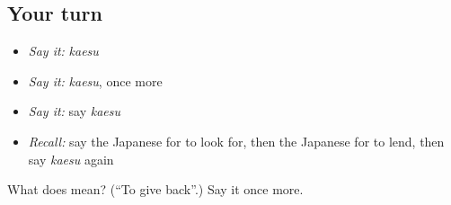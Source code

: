 \subsection*{Your turn}
\begin{itemize}
\raggedright
  \item \emph{Say it:} \emph{kaesu}
  \item \emph{Say it:} \emph{kaesu}, once more
  \item \emph{Say it:} say \emph{kaesu}
  \item \emph{Recall:} say the Japanese for to look for, then the Japanese for to lend, then say \emph{kaesu} again
\end{itemize}

\begin{tcolorbox}[breakable,colback=teal!4,colframe=teal!35!black,title={Before you move on}]
What does  mean? (\textquotedblleft{}To give back\textquotedblright{}.) Say it once more.
\end{tcolorbox}
